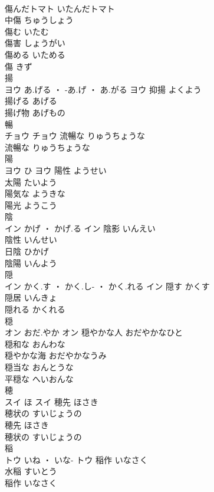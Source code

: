\documentclass[8pt]{extreport}
\begin{document}
\begin{CJK}{UTF8}{min}
\\	傷んだトマト	いたんだトマト	
\\	中傷	ちゅうしょう	
\\	傷む	いたむ	
\\	傷害	しょうがい	
\\	傷める	いためる	
\\	傷	きず	
\\	揚	
\\	ヨウ	あ.げる ・ -あ.げ ・ あ.がる	ヨウ	抑揚	よくよう	
\\	揚げる	あげる	
\\	揚げ物	あげもの	
\\	暢	
\\	チョウ		チョウ	流暢な	りゅうちょうな	
\\	流暢な	りゅうちょうな	
\\	陽	
\\	ヨウ	ひ	ヨウ	陽性	ようせい	
\\	太陽	たいよう	
\\	陽気な	ようきな	
\\	陽光	ようこう	
\\	陰	
\\	イン	かげ ・ かげ.る	イン	陰影	いんえい	
\\	陰性	いんせい	
\\	日陰	ひかげ	
\\	陰陽	いんよう	
\\	隠	
\\	イン	かく.す ・ かく.し- ・ かく.れる	イン	隠す	かくす	
\\	隠居	いんきょ	
\\	隠れる	かくれる	
\\	穏	
\\	オン	おだ.やか	オン	穏やかな人	おだやかなひと	
\\	穏和な	おんわな	
\\	穏やかな海	おだやかなうみ	
\\	穏当な	おんとうな	
\\	平穏な	へいおんな	
\\	穂	
\\	スイ	ほ	スイ	穂先	ほさき	
\\	穂状の	すいじょうの	
\\	穂先	ほさき	
\\	穂状の	すいじょうの	
\\	稲	
\\	トウ	いね ・ いな-	トウ	稲作	いなさく	
\\	水稲	すいとう	
\\	稲作	いなさく	

\end{CJK}
\end{document}
